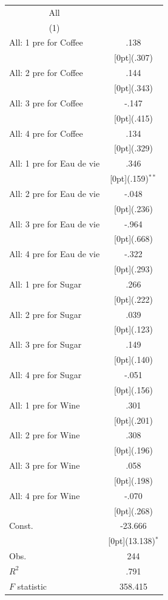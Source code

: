 \documentclass[12pt,a4paper,titlepage]{article}
\begin{document}
{\newpage
{}
\begin{tabular*}{\textwidth}{@{\extracolsep{\fill}}lc}	
	\multicolumn{1}{c}{All} \\
\cline{2-2}	
	\multicolumn{1}{c}{(1)} \\
\hline	
All: 1 pre for Coffee &	.138 \\
&	\raisebox{.7ex}[0pt]{\scriptsize (.307)} \\
All: 2 pre for Coffee &	.144 \\
&	\raisebox{.7ex}[0pt]{\scriptsize (.343)} \\
All: 3 pre for Coffee &	-.147 \\
&	\raisebox{.7ex}[0pt]{\scriptsize (.415)} \\
All: 4 pre for Coffee &	.134 \\
&	\raisebox{.7ex}[0pt]{\scriptsize (.329)} \\
All: 1 pre for Eau de vie &	.346 \\
&	\raisebox{.7ex}[0pt]{\scriptsize (.159)$^{**}$} \\
All: 2 pre for Eau de vie &	-.048 \\
&	\raisebox{.7ex}[0pt]{\scriptsize (.236)} \\
All: 3 pre for Eau de vie &	-.964 \\
&	\raisebox{.7ex}[0pt]{\scriptsize (.668)} \\
All: 4 pre for Eau de vie &	-.322 \\
&	\raisebox{.7ex}[0pt]{\scriptsize (.293)} \\
All: 1 pre for Sugar &	.266 \\
&	\raisebox{.7ex}[0pt]{\scriptsize (.222)} \\
All: 2 pre for Sugar &	.039 \\
&	\raisebox{.7ex}[0pt]{\scriptsize (.123)} \\
All: 3 pre for Sugar &	.149 \\
&	\raisebox{.7ex}[0pt]{\scriptsize (.140)} \\
All: 4 pre for Sugar &	-.051 \\
&	\raisebox{.7ex}[0pt]{\scriptsize (.156)} \\
All: 1 pre for Wine &	.301 \\
&	\raisebox{.7ex}[0pt]{\scriptsize (.201)} \\
All: 2 pre for Wine &	.308 \\
&	\raisebox{.7ex}[0pt]{\scriptsize (.196)} \\
All: 3 pre for Wine &	.058 \\
&	\raisebox{.7ex}[0pt]{\scriptsize (.198)} \\
All: 4 pre for Wine &	-.070 \\
&	\raisebox{.7ex}[0pt]{\scriptsize (.268)} \\
Const. &	-23.666 \\
&	\raisebox{.7ex}[0pt]{\scriptsize (13.138)$^{*}$} \\
Obs. &	244 \\
$ R^2$ &	.791 \\
$ F$ statistic &	358.415 \\
\hline\hline	
\end{tabular*}%


}
\end{document}
